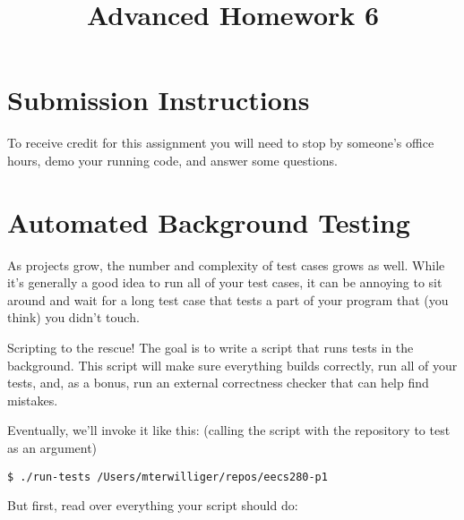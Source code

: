 \documentclass{article}
\begin{document}
\fancyfoot[C]{\color{gray} \thepage~/~\pageref*{LastPage}}
\pagestyle{fancyplain}


\title{\textbf{Advanced Homework 6\\}}
\author{\textbf{\color{red}{Due: Before February 25, 10:00PM}}}
\date{}
\maketitle


\section*{Submission Instructions}
To receive credit for this assignment you will need to stop by someone's
office hours, demo your running code, and answer some questions.

\section{Automated Background Testing}

As projects grow, the number and complexity of test cases grows as well. While
it's generally a good idea to run all of your test cases, it can be annoying
to sit around and wait for a long test case that tests a part of your program
that (you think) you didn't touch.

\medskip
\noindent
Scripting to the rescue! The goal is to write a script that runs tests in the
background. This script will make sure everything builds correctly, run all of
your tests, and, as a bonus, run an external correctness checker that can help
find mistakes.

\medskip
\noindent
Eventually, we'll invoke it like this: (calling the script with the repository to test as an argument)
\begin{lstlisting}
$ ./run-tests /Users/mterwilliger/repos/eecs280-p1
\end{lstlisting}

\noindent
But first, read over everything your script should do:
\end{document}
